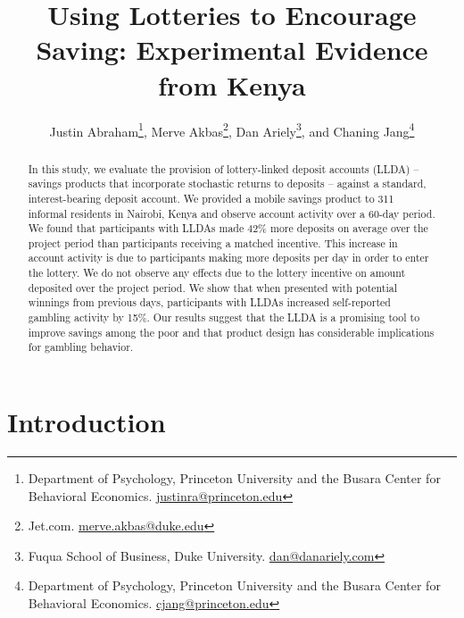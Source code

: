 \documentclass[12pt]{article}
\begin{document}
\title{Using Lotteries to Encourage Saving: Experimental Evidence from Kenya}

\author{Justin Abraham\thanks{Department of Psychology, Princeton University and the Busara Center for Behavioral Economics. \protect\href{mailto:justinra@princeton.edu}{justinra@princeton.edu}}, Merve Akbas\thanks{Jet.com. \protect\href{mailto:merve.akbas@duke.edu}{merve.akbas@duke.edu}}, Dan Ariely\thanks{Fuqua School of Business, Duke University. \protect\href{mailto:dan@danariely.com}{dan@danariely.com}}, and Chaning Jang\thanks{Department of Psychology, Princeton University and the Busara Center for Behavioral Economics. \protect\href{mailto:cjang@princeton.edu}{cjang@princeton.edu}}}

\maketitle

\begin{abstract}

	In this study, we evaluate the provision of lottery-linked deposit accounts (LLDA) -- savings products that incorporate stochastic returns to deposits -- against a standard, interest-bearing deposit account. We provided a mobile savings product to 311 informal residents in Nairobi, Kenya and observe account activity over a 60-day period. We found that participants with LLDAs made 42\% more deposits on average over the project period than participants receiving a matched incentive. This increase in account activity is due to participants making more deposits per day in order to enter the lottery. We do not observe any effects due to the lottery incentive on amount deposited over the project period. We show that when presented with potential winnings from previous days, participants with LLDAs increased self-reported gambling activity by 15\%. Our results suggest that the LLDA is a promising tool to improve savings among the poor and that product design has considerable implications for gambling behavior.

\end{abstract}

\newpage

\section{Introduction}
\end{document}
